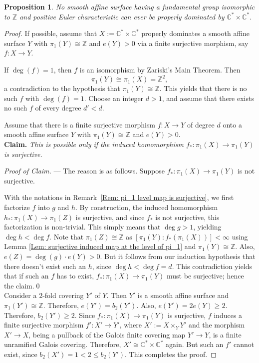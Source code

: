 \documentclass[12pt,reqno,twoside]{amsart}
\newtheorem{prop}[theorem]{Proposition}
\theoremstyle{definition}
\numberwithin{equation}{section}
\newcommand{\C}{\mathbb{C}}
\newcommand{\Z}{\mathbb{Z}}
\begin{document}
\begin{prop}\label{Prop: No finite map from 2-torus to surface having infinite cyclic pi_1 and positive Euler characteristic}
	No smooth affine surface having a fundamental group isomorphic to $\Z$ and positive Euler characteristic can ever be properly dominated by $\C^* \times \C^*$.
\end{prop}
\begin{proof}
    If possible, assume that $X:=\C^* \times \C^*$ properly dominates a smooth affine surface $Y$ with $\pi_1(Y)\cong\Z$ and $e(Y)>0$ via a finite surjective morphism, say $f: X \to Y$.
 
    If $\deg(f)=1$, then $f$ is an isomorphism by Zariski's Main Theorem. Then $$\pi_1(Y) \cong \pi_1(X) = \Z^2,$$ a contradiction to the hypothesis that $\pi_1(Y)\cong \Z$. This yields that there is no such $f$ with $\deg(f)=1$. Choose an integer $d>1$, and assume that there exists no such $f$ of every degree $d' < d$.
    
    Assume that there is a finite surjective morphism $f: X \to Y$ of degree $d$ onto a smooth affine surface $Y$ with $\pi_1(Y)\cong \Z$ and $e(Y)>0$.\\
    
    {\bf Claim.} {\it This is possible only if the induced homomorphism $f_\ast: \pi_1(X) \to \pi_1(Y)$ is surjective.}
    \medskip
    
    {\it Proof of Claim.} --- The reason is as follows. Suppose $f_\ast: \pi_1(X) \to \pi_1(Y)$ is not surjective. 
 
   With the notations in Remark~\ref{Rem: pi_1 level map is surjective}, we first factorize $f$ into $g$ and $h$. By construction, the induced homomorphism $h_\ast : \pi_1(X) \to \pi_1(Z)$ is surjective, and since $f_\ast$ is not surjective, this factorization is non-trivial. This simply means that $\deg g >1$, yielding $\deg h < \deg f$. Note that $\pi_1(Z) \cong \Z$ as $[\pi_1(Y): f_\ast(\pi_1(X))] < \infty$ using Lemma \ref{Lem: surjective induced map at the level of pi_1} and $\pi_1(Y) \cong \Z$. Also, $e(Z)=\deg(g) \cdot e(Y) > 0$. But it follows from our induction hypothesis that there doesn't exist such an $h$, since $\deg h < \deg f = d$. This contradiction yields that if such an $f$ has to exist, $f_\ast: \pi_1(X) \to \pi_1(Y)$ must be surjective; hence the claim.\qed\\
    
    Consider a $2$-fold covering $Y'$ of $Y$. Then $Y'$ is a smooth affine surface and $\pi_1(Y') \cong \Z$. Therefore, $e(Y')=b_2(Y')$. Also, $e(Y')=2e(Y) \geq 2$. Therefore, $b_2(Y') \geq 2$. Since $f_\ast: \pi_1(X) \to \pi_1(Y)$ is surjective, $f$ induces a finite surjective morphism $f' : X' \to Y'$, where $X':=X \times_{Y} Y'$ and the morphism $X' \to X$, being a pullback of the Galois finite covering map $Y' \to Y$, is a finite unramified Galois covering. Therefore, $X' \cong \C^* \times \C^*$ again. But such an $f'$ cannot exist, since $b_2(X') =1 < 2 \leq b_2(Y')$. This completes the proof.
\end{proof}
\end{document}
